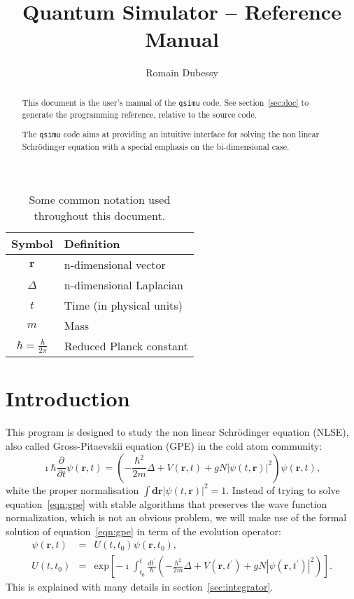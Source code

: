 \documentclass[12pt,a4paper]{report}
\author{Romain Dubessy}
\title{Quantum Simulator -- Reference Manual}
\newcommand{\abs}[1]{\left|#1\right|}
\newcommand{\qsimu}{\texttt{qsimu}{} }
\renewcommand{\exp}[1]{\textrm{exp}\left[#1\right]}
\begin{document}
\maketitle
\begin{abstract}
This document is the user's manual of the \qsimu code.
See section~\ref{sec:doc} to generate the programming reference, relative to the source code.

The \qsimu code aims at providing an intuitive interface for solving the non linear Schrödinger equation with a special emphasis on the bi-dimensional case.
\end{abstract}
\begin{table}
\begin{center}
\begin{tabular}{c|l}
Symbol & Definition \\\hline
$\bm{r}$ & n-dimensional vector\\
$\Delta$ & n-dimensional Laplacian\\
$t$ & Time (in physical units)\\
$m$ & Mass\\
$\hbar=\frac{h}{2\pi}$ & Reduced Planck constant\\
\hline
\end{tabular}
\caption{\label{tab:notations}Some common notation used throughout this document.}
\end{center}
\end{table}
\cleardoublepage
\tableofcontents
\chapter{Introduction}
This program is designed to study the non linear Schrödinger equation (NLSE), also called Gross-Pitaevskii equation (GPE) in the cold atom community:
\begin{equation}
\imath\hbar\frac{\partial}{\partial t}\psi(\bm{r},t)=\left(-\frac{\hbar^2}{2m}\Delta+V(\bm{r},t)+gN\abs{\psi(t,\bm{r})}^2\right)\psi(\bm{r},t),
\label{eqn:gpe}
\end{equation}
white the proper normalisation $\int \bm{dr}\abs{\psi(t,\bm{r})}^2=1$.
Instead of trying to solve equation~\eqref{eqn:gpe} with stable algorithms that preserves the wave function normalization, which is not an obvious problem, we will make use of the formal solution of equation~\eqref{eqn:gpe} in term of the evolution operator:
\begin{subequations}
\begin{eqnarray}
\psi(\bm{r},t)&=&U(t,t_0)\psi(\bm{r},t_0),\\
U(t,t_0)&=&\exp{-\imath\int_{t_0}^t\frac{dt^\prime}{\hbar}\left(-\frac{\hbar^2}{2m}\Delta+V(\bm{r},t^\prime)+gN\abs{\psi(\bm{r},t^\prime)}^2\right)}.
\label{eqn:evolution}
\end{eqnarray}
\end{subequations}
This is explained with many details in section~\ref{sec:integrator}.
\end{document}
